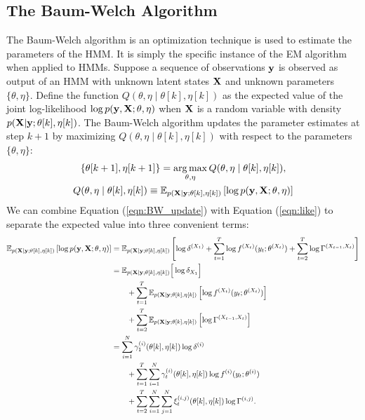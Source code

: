 \subsection{The Baum-Welch Algorithm}

The Baum-Welch algorithm is an optimization technique is used to estimate the parameters of the HMM. It is simply the specific instance of the EM algorithm when applied to HMMs. Suppose a sequence of observations $\mathbf{y}$ is observed as output of an HMM with unknown latent states $\mathbf{X}$ and unknown parameters $\{\theta,\eta\}$. Define the function $Q(\theta,\eta \mid \theta[k],\eta[k])$ as the expected value of the joint log-likelihood $\log p(\mathbf{y},\mathbf{X}; \theta,\eta)$ when $\mathbf{X}$ is a random variable with density $p(\mathbf{X} | \mathbf{y};\theta[k],\eta[k])$. The Baum-Welch algorithm updates the parameter estimates at step $k+1$ by maximizing $Q(\theta,\eta \mid \theta[k],\eta[k])$ with respect to the parameters $\{\theta,\eta\}$:
%
\begin{gather}
    \left\{\theta[k+1],\eta[k+1]\right\} = \operatorname*{arg\,max}_{\theta,\eta} Q(\theta,\eta \mid \theta[k],\eta[k]), \\
    Q(\theta,\eta \mid \theta[k],\eta[k]) \equiv \mathbb{E}_{p(\mathbf{X} \mid \mathbf{y};\theta[k],\eta[k])}\left[\log p(\mathbf{y},\mathbf{X};\theta,\eta) \right]
    \label{eqn:BW_update}
\end{gather}
%
We can combine Equation (\ref{eqn:BW_update}) with Equation (\ref{eqn:like}) to separate the expected value into three convenient terms:
\begin{align*}
    \mathbb{E}_{p(\mathbf{X} \mid \mathbf{y};\theta[k],\eta[k])}\left[\log p(\mathbf{y},\mathbf{X};\theta,\eta) \right] &= \mathbb{E}_{p(\mathbf{X} \mid \mathbf{y};\theta[k],\eta[k])} \left[\log \delta^{(X_1)} + \sum_{t=1}^T \log f^{(X_t)}(y_t;\theta^{(X_t)}) + \sum_{t=2}^{T} \log \Gamma^{(X_{t-1},X_{t})} \right] \\
    &= \mathbb{E}_{p(\mathbf{X} \mid \mathbf{y};\theta[k],\eta[k])} \Big[\log \delta_{X_1}\Big] \\ & \qquad + \sum_{t = 1}^T \mathbb{E}_{p(\mathbf{X} \mid \mathbf{y};\theta[k],\eta[k])} \left[ \log f^{(X_t)}(y_t;\theta^{(X_t)})\right] \\ & \qquad + \sum_{t=2}^{T} \mathbb{E}_{p(\mathbf{X} \mid \mathbf{y};\theta[k],\eta[k])} \left[ \log \Gamma^{(X_{t-1},X_{t})} \right] \\
    &= \sum_{i=1}^N \gamma^{(i)}_1(\theta[k],\eta[k]) \log \delta^{(i)} \\ & \qquad + \sum_{t = 1}^T \sum_{i=1}^N \gamma^{(i)}_t(\theta[k],\eta[k]) \log f^{(i)}(y_t;\theta^{(i)}) \\
    & \qquad + \sum_{t=2}^{T} \sum_{i=1}^N \sum_{j=1}^N \xi_t^{(i,j)}(\theta[k],\eta[k]) \log \Gamma^{(i,j)}.
\end{align*}

